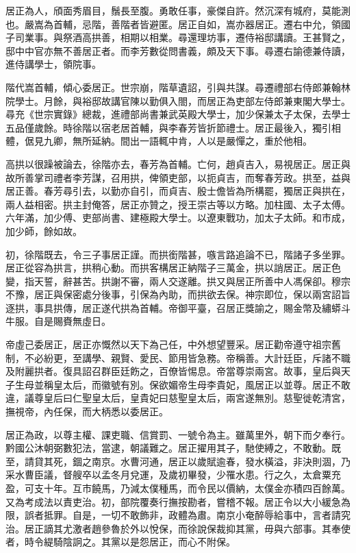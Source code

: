 \begin{pinyinscope}
居正為人，頎面秀眉目，鬚長至腹。勇敢任事，豪傑自許。然沉深有城府，莫能測也。嚴嵩為首輔，忌階，善階者皆避匿。居正自如，嵩亦器居正。遷右中允，領國子司業事。與祭酒高拱善，相期以相業。尋還理坊事，遷侍裕邸講讀。王甚賢之，邸中中官亦無不善居正者。而李芳數從問書義，頗及天下事。尋遷右諭德兼侍讀，進侍講學士，領院事。

階代嵩首輔，傾心委居正。世宗崩，階草遺詔，引與共謀。尋遷禮部右侍郎兼翰林院學士。月餘，與裕邸故講官陳以勤俱入閤，而居正為吏部左侍郎兼東閣大學士。尋充《世宗實錄》總裁，進禮部尚書兼武英殿大學士，加少保兼太子太保，去學士五品僅歲餘。時徐階以宿老居首輔，與李春芳皆折節禮士。居正最後入，獨引相體，倨見九卿，無所延納。間出一語輒中肯，人以是嚴憚之，重於他相。

高拱以很躁被論去，徐階亦去，春芳為首輔。亡何，趙貞吉入，易視居正。居正與故所善掌司禮者李芳謀，召用拱，俾領吏部，以扼貞吉，而奪春芳政。拱至，益與居正善。春芳尋引去，以勤亦自引，而貞吉、殷士儋皆為所構罷，獨居正與拱在，兩人益相密。拱主封俺答，居正亦贊之，授王崇古等以方略。加柱國、太子太傅。六年滿，加少傅、吏部尚書、建極殿大學士。以遼東戰功，加太子太師。和市成，加少師，餘如故。

初，徐階既去，令三子事居正謹。而拱銜階甚，嗾言路追論不已，階諸子多坐罪。居正從容為拱言，拱稍心動。而拱客構居正納階子三萬金，拱以誚居正。居正色變，指天誓，辭甚苦。拱謝不審，兩人交遂離。拱又與居正所善中人馮保卻。穆宗不豫，居正與保密處分後事，引保為內助，而拱欲去保。神宗即位，保以兩宮詔旨逐拱，事具拱傳，居正遂代拱為首輔。帝御平臺，召居正獎諭之，賜金幣及繡蟒斗牛服。自是賜賚無虛日。

帝虛己委居正，居正亦慨然以天下為己任，中外想望豐采。居正勸帝遵守祖宗舊制，不必紛更，至講學、親賢、愛民、節用皆急務。帝稱善。大計廷臣，斥諸不職及附麗拱者。復具詔召群臣廷飭之，百僚皆惕息。帝當尊崇兩宮。故事，皇后與天子生母並稱皇太后，而徽號有別。保欲媚帝生母李貴妃，風居正以並尊。居正不敢違，議尊皇后曰仁聖皇太后，皇貴妃曰慈聖皇太后，兩宮遂無別。慈聖徙乾清宮，撫視帝，內任保，而大柄悉以委居正。

居正為政，以尊主權、課吏職、信賞罰、一號令為主。雖萬里外，朝下而夕奉行。黔國公沐朝弼數犯法，當逮，朝議難之。居正擢用其子，馳使縛之，不敢動。既至，請貸其死，錮之南京。水曹河通，居正以歲賦逾春，發水橫溢，非決則涸，乃采水曹臣議，督艘卒以孟冬月兌運，及歲初畢發，少罹水患。行之久，太倉粟充盈，可支十年。互市饒馬，乃減太僕種馬，而令民以價納，太僕金亦積四百餘萬。又為考成法以責吏治。初，部院覆奏行撫按勘者，嘗稽不報。居正令以大小緩急為限，誤者抵罪。自是，一切不敢飾非，政體為肅。南京小奄醉辱給事中，言者請究治。居正謫其尤激者趙參魯於外以悅保，而徐說保裁抑其黨，毋與六部事。其奉使者，時令緹騎陰詗之。其黨以是怨居正，而心不附保。


\end{pinyinscope}
